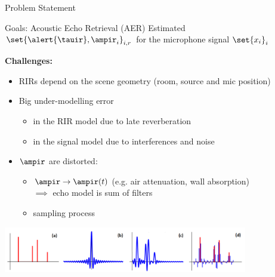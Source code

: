 \begin{frame}{Problem Statement}

    \begin{mydefblock}{Goals: Acoustic Echo Retrieval (AER)}
        Estimated $\set{\alert{\tauir}, \ampir_i}_{i,r}$
        for the microphone signal $\set{x_i}_i$
    \end{mydefblock}

    \textbf{Challenges:}
    \begin{itemize}
        \item RIRs depend on the scene geometry (room, source and mic position)
        \item Big under-modelling error
        \begin{itemize}
            \item in the RIR model due to late reverberation
            \item in the signal model due to interferences and noise
        \end{itemize}
        \item $\ampir$ are distorted:
        \begin{itemize}
            \item $\ampir \to \ampir(t)$ (e.g. air attenuation, wall absorption)
            \\\hspace{.5em}$\implies$ echo model is sum of filters
            \item sampling process{\footnotesize~\cite{tukuljac2018mulan}}
        \end{itemize}
    \end{itemize}

    \begin{center}
        \includegraphics[width=0.8\textwidth]{figures/basismismatch.png}
        \\{}
    \end{center}

\end{frame}